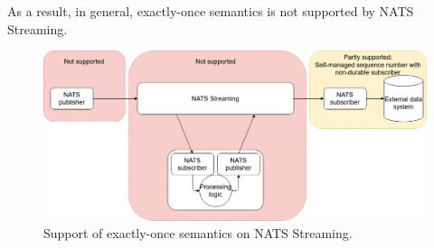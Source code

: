 As a result, in general, exactly-once semantics is not supported by NATS Streaming.


\begin{figure}[h]
	\centering
	\includegraphics[width=\linewidth]{images/exactly-once-nats.png}
	\caption{Support of exactly-once semantics on NATS Streaming.}
	\label{fig:exactlyoncenats}
\end{figure}






